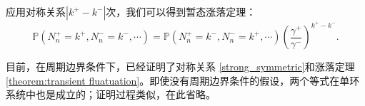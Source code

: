 
应用对称关系$|k^+ -k^-|$次，我们可以得到暂态涨落定理：
\begin{equation}\label{theorem:transient fluatuation}
	\mathbb{P}\left(N^+_n=k^+,N^-_n=k^-,\cdots\right)
	= \mathbb{P}\left(N^+_n=k^-,N^-_n=k^+,\cdots\right)\left(\frac{\gamma^+}{\gamma^-}\right)^{k^+-k^-}.
\end{equation}

目前，在周期边界条件下，已经证明了对称关系 \ref{strong_symmetric}和涨落定理 \ref{theorem:transient fluatuation}。即使没有周期边界条件的假设，两个等式在单环系统中也是成立的；证明过程类似，在此省略。

